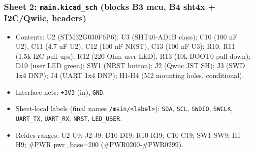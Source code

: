 \documentclass[11pt,a4paper]{article}
\begin{document}
\subsubsection*{Sheet 2: \texttt{main.kicad\_sch} (blocks B3 mcu, B4 sht4x + I2C/Qwiic, headers)}
\begin{itemize}
\item Contents: U2 (STM32G030F6P6); U3 (SHT40-AD1B class); C10 (100 nF U2),
C11 (4.7 uF U2), C12 (100 nF NRST), C13 (100 nF U3); R10, R11 (1.5k I2C
pull-ups), R12 (220 Ohm user LED), R13 (10k BOOT0 pull-down); D10 (user LED green); SW1 (NRST
button); J2 (Qwiic JST SH); J3 (SWD 1x4 DNP); J4 (UART 1x4 DNP);
H1-H4 (M2 mounting holes, conditional).
\item Interface nets: \texttt{+3V3} (in), \texttt{GND}.
\item Sheet-local labels (final names \texttt{/main/\textless{}label\textgreater{}}): \texttt{SDA}, \texttt{SCL}, \texttt{SWDIO},
\texttt{SWCLK}, \texttt{UART\_TX}, \texttt{UART\_RX}, \texttt{NRST}, \texttt{LED\_USER}.
\item Refdes ranges: U2-U9; J2-J9; D10-D19; R10-R19; C10-C19; SW1-SW9; H1-H9;
\#PWR pwr\_base=200 (\#PWR0200-\#PWR0299).
\end{itemize}
\end{document}
